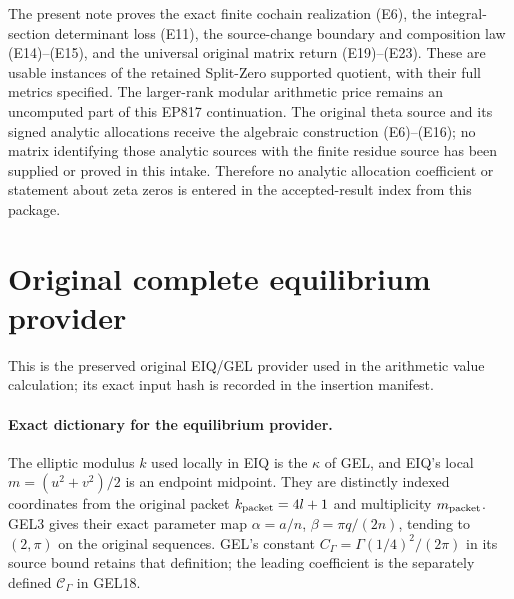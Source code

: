 The present note proves the exact finite cochain realization (E6),
the integral-section determinant loss (E11), the source-change
boundary and composition law (E14)--(E15), and the universal original
matrix return (E19)--(E23).  These are usable instances of the retained
Split-Zero supported quotient, with their full metrics specified.
The larger-rank modular arithmetic price remains an uncomputed part
of this EP817 continuation.  The original theta source and its signed
analytic allocations receive the algebraic construction (E6)--(E16);
no matrix identifying those analytic sources with the finite residue
source has been supplied or proved in this intake.  Therefore no
analytic allocation coefficient or statement about zeta zeros is
entered in the accepted-result index from this package.



\endgroup

\clearpage
\begingroup


\setcounter{equation}{0}
\renewcommand{\theequation}{EIQ.\arabic{equation}}
\section*{Original complete equilibrium provider}
This is the preserved original EIQ/GEL provider used in the arithmetic value calculation; its exact input hash is recorded in the insertion manifest.

\paragraph{Exact dictionary for the equilibrium provider.}
The elliptic modulus $k$ used locally in EIQ is the $\kappa$ of GEL,
and EIQ's local $m=(u^2+v^2)/2$ is an endpoint midpoint. They are
distinctly indexed coordinates from the original packet
$k_{\rm packet}=4l+1$ and multiplicity $m_{\rm packet}$.
GEL3 gives their exact parameter map
$\alpha=a/n$, $\beta=\pi q/(2n)$, tending to $(2,\pi)$ on
the original sequences. GEL's constant $C_\Gamma=\Gamma(1/4)^2/(2\pi)$
in its source bound retains that definition; the leading coefficient
is the separately defined $\mathcal C_\Gamma$ in GEL18.

